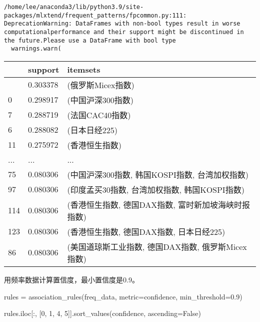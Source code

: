 \documentclass[
  letterpaper,
  DIV=11,
  numbers=noendperiod]{scrreprt}
\newenvironment{Shaded}{\begin{snugshade}}{\end{snugshade}}
\newcommand{\DecValTok}[1]{\textcolor[rgb]{0.68,0.00,0.00}{#1}}
\newcommand{\FloatTok}[1]{\textcolor[rgb]{0.68,0.00,0.00}{#1}}
\newcommand{\NormalTok}[1]{\textcolor[rgb]{0.00,0.23,0.31}{#1}}
\newcommand{\OperatorTok}[1]{\textcolor[rgb]{0.37,0.37,0.37}{#1}}
\newcommand{\StringTok}[1]{\textcolor[rgb]{0.13,0.47,0.30}{#1}}
\newcommand{\VariableTok}[1]{\textcolor[rgb]{0.07,0.07,0.07}{#1}}
\begin{document}
\begin{verbatim}
/home/lee/anaconda3/lib/python3.9/site-packages/mlxtend/frequent_patterns/fpcommon.py:111: DeprecationWarning: DataFrames with non-bool types result in worse computationalperformance and their support might be discontinued in the future.Please use a DataFrame with bool type
  warnings.warn(
\end{verbatim}

\begin{longtable}[]{@{}lll@{}}
\toprule\noalign{}
& support & itemsets \\
\midrule\noalign{}
\endhead
\bottomrule\noalign{}
\endlastfoot
1 & 0.303378 & (俄罗斯Micex指数) \\
0 & 0.298917 & (中国沪深300指数) \\
7 & 0.288719 & (法国CAC40指数) \\
6 & 0.288082 & (日本日经225) \\
11 & 0.275972 & (香港恒生指数) \\
... & ... & ... \\
75 & 0.080306 & (中国沪深300指数, 韩国KOSPI指数, 台湾加权指数) \\
97 & 0.080306 & (印度孟买30指数, 台湾加权指数, 韩国KOSPI指数) \\
114 & 0.080306 & (香港恒生指数, 德国DAX指数, 富时新加坡海峡时报指数) \\
123 & 0.080306 & (香港恒生指数, 德国DAX指数, 日本日经225) \\
86 & 0.080306 & (美国道琼斯工业指数, 德国DAX指数, 俄罗斯Micex指数) \\
\end{longtable}

用频率数据计算置信度，最小置信度是0.9。

\begin{Shaded}
\begin{Highlighting}[]
\NormalTok{rules }\OperatorTok{=}\NormalTok{ association\_rules(freq\_data, metric}\OperatorTok{=}\StringTok{\textquotesingle{}confidence\textquotesingle{}}\NormalTok{, min\_threshold}\OperatorTok{=}\FloatTok{0.9}\NormalTok{)}

\NormalTok{rules.iloc[:, [}\DecValTok{0}\NormalTok{, }\DecValTok{1}\NormalTok{, }\DecValTok{4}\NormalTok{, }\DecValTok{5}\NormalTok{]].sort\_values(}\StringTok{\textquotesingle{}confidence\textquotesingle{}}\NormalTok{, ascending}\OperatorTok{=}\VariableTok{False}\NormalTok{)}
\end{Highlighting}
\end{Shaded}
\end{document}
